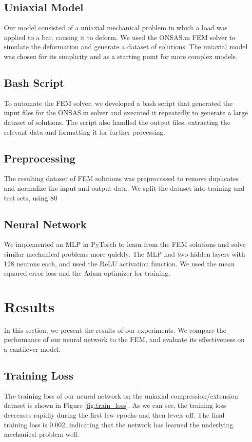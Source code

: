 \documentclass[11pt]{scrartcl} %
\begin{document}
\subsection{Uniaxial Model}
Our model consisted of a uniaxial mechanical problem in which a load was applied to a bar, causing it to deform. We used the ONSAS.m FEM solver to simulate the deformation and generate a dataset of solutions. The uniaxial model was chosen for its simplicity and as a starting point for more complex models.

\subsection{Bash Script}
To automate the FEM solver, we developed a bash script that generated the input files for the ONSAS.m solver and executed it repeatedly to generate a large dataset of solutions. The script also handled the output files, extracting the relevant data and formatting it for further processing.

\subsection{Preprocessing}
The resulting dataset of FEM solutions was preprocessed to remove duplicates and normalize the input and output data. We split the dataset into training and test sets, using 80%

\subsection{Neural Network}
We implemented an MLP in PyTorch to learn from the FEM solutions and solve similar mechanical problems more quickly. The MLP had two hidden layers with 128 neurons each, and used the ReLU activation function. We used the mean squared error loss and the Adam optimizer for training.

\section{Results}
In this section, we present the results of our experiments. We compare the performance of our neural network to the FEM, and evaluate its effectiveness on a cantilever model.

\subsection{Training Loss}
The training loss of our neural network on the uniaxial compression/extension dataset is shown in Figure \ref{fig:train_loss}. As we can see, the training loss decreases rapidly during the first few epochs and then levels off. The final training loss is 0.002, indicating that the network has learned the underlying mechanical problem well.
\end{document}
